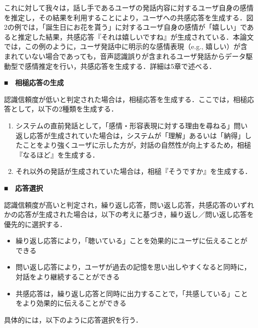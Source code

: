 \documentclass[japanese]{jnlp_1.4}
\begin{document}
これに対して我々は，話し手であるユーザの発話内容に対するユーザ自身の感情を推定し，その結果を利用することにより，ユーザへの共感応答を生成する．図2の例では，「誕生日にお花を貰う」に対するユーザ自身の感情が「嬉しい」であると推定した結果，共感応答『それは嬉しいですね』が生成されている．本論文では，この例のように，ユーザ発話中に明示的な感情表現（e.g., 嬉しい）が含まれていない場合であっても，音声認識誤りが含まれるユーザ発話からデータ駆動型で感情推定を行い，共感応答を生成する．詳細は5章で述べる．
            

\noindent\textbf{■　相槌応答の生成}

認識信頼度が低いと判定された場合は，相槌応答を生成する．ここでは，相槌応答として，以下の2種類を生成する．

\begin{enumerate}
 \item システムの直前発話として，「感情・形容表現に対する理由を尋ねる」問い返し応答が生成されていた場合は，システムが「理解」あるいは「納得」したことをより強くユーザに示した方が，対話の自然性が向上するため，相槌『なるほど』を生成する．
 \item それ以外の発話が生成されていた場合は，相槌『そうですか』を生成する．
\end{enumerate}


\noindent\textbf{■　応答選択}

認識信頼度が高いと判定され，繰り返し応答，問い返し応答，共感応答のいずれかの応答が生成された場合は，以下の考えに基づき，繰り返し／問い返し応答を優先的に選択する．

\begin{itemize}
   \item 繰り返し応答により，「聴いている」ことを効果的にユーザに伝えることができる
   \item 問い返し応答により，ユーザが過去の記憶を思い出しやすくなると同時に，対話をより継続することができる
   \item 共感応答は，繰り返し応答と同時に出力することで，「共感している」ことをより効果的に伝えることができる
\end{itemize}

具体的には，以下のように応答選択を行う．
\end{document}
